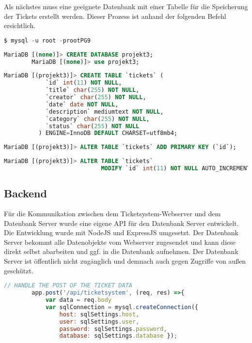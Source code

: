 \documentclass{scrartcl}
\begin{document}
\begin{flushleft}
    \newpage

    Als nächstes muss eine geeignete Datenbank mit einer Tabelle für die Speicherung der Tickets erstellt werden. Dieser Prozess ist anhand der folgenden Befehl ersichtlich.
    \begin{lstlisting}[language=sql]
        $ mysql -u root -prootPG9 \end{lstlisting}
    \begin{lstlisting}[language=sql]
        MariaDB [(none)]> CREATE DATABASE projekt3; 
        MariaDB [(none)]> use projekt3;\end{lstlisting}
    \begin{lstlisting}[language=sql]
        MariaDB [(projekt3)]> CREATE TABLE `tickets` (
            `id` int(11) NOT NULL,
            `title` char(255) NOT NULL,
            `creator` char(255) NOT NULL,
            `date` date NOT NULL,
            `description` mediumtext NOT NULL,
            `category` char(255) NOT NULL,
            `status` char(255) NOT NULL
          ) ENGINE=InnoDB DEFAULT CHARSET=utf8mb4;\end{lstlisting}
    \begin{lstlisting}[language=sql]
        MariaDB [(projekt3)]> ALTER TABLE `tickets` ADD PRIMARY KEY (`id`);\end{lstlisting}
    \begin{lstlisting}[language=sql]
        MariaDB [(projekt3)]> ALTER TABLE `tickets` 
                            MODIFY `id` int(11) NOT NULL AUTO_INCREMENT;\end{lstlisting}



    

    \subsection{Backend}
    Für die Kommunikation zwischen dem Ticketsystem-Webserver und dem Datenbank Server wurde eine eigene API für den Datenbank Server entwickelt. Die Entwicklung wurde mit NodeJS und ExpressJS umgesetzt.
    Der Datenbank Server bekommt alle Datenobjekte vom Webserver zugesendet und kann diese direkt selbst abarbeiten und ggf. in die Datenbank aufnehmen. Der Datenbank Server ist öffentlich nicht zugänglich und demnach auch gegen Zugriffe von außen geschützt.
    
    \begin{lstlisting}[language=JavaScript, caption={Datenbank API-Endpunkt: Ticket in Datenbank aufnehmen}, captionpos=t]
        // HANDLE THE POST OF THE TICKET DATA
        app.post('/api/ticketsystem', (req, res) =>{
            var data = req.body
            var sqlConnection = mysql.createConnection({
                host: sqlSettings.host,
                user: sqlSettings.user,
                password: sqlSettings.password,
                database: sqlSettings.database });


\end{lstlisting}
\end{flushleft}
\end{document}

